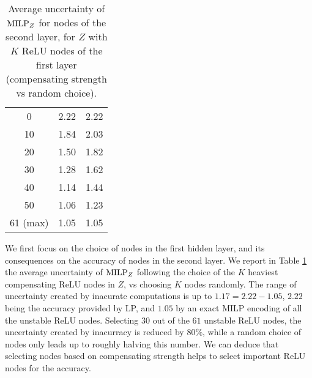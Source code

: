 \begin{table}[b!]
	\centering
	\begin{tabular}{|c||c|c|}
		\hline
		\text{Number $K$ of nodes in $Z$}  &  \text{Compensate strength} & \text{Random Choice}  \\ \hline
		\hline
		0  &  2.22 & 2.22  \\ \hline
		10  &  1.84 & 2.03  \\ \hline
		20  &  1.50 & 1.82  \\ \hline
		30  &  1.28 & 1.62  \\ \hline
		40  &  1.14 & 1.44  \\ \hline
		50  &  1.06 & 1.23  \\ \hline
		61 (max) & 1.05 &  1.05 \\ \hline
	\end{tabular}
	\caption{Average uncertainty of ${\textrm{MILP}}_Z$ for nodes of the second layer, for $Z$ with $K$ ReLU nodes of the first layer (compensating strength vs random choice).}
	\label{tab:example0}
\end{table}




We first focus on the choice of nodes in the first hidden layer, and its consequences on the accuracy of nodes in the second layer. 
We report in Table \ref{tab:example0} the average uncertainty of ${\textrm{MILP}}_Z$ following the choice of the $K$ heaviest compensating ReLU nodes in $Z$, vs choosing $K$ nodes randomly. The range of uncertainty created by inacurate computations is up to $1.17=2.22-1.05$, $2.22$ being the accuracy provided by LP, and $1.05$ by an exact MILP encoding of all the unstable ReLU nodes. Selecting $30$ out of the $61$ unstable ReLU nodes, the uncertainty created by inacurracy is reduced by $80\%$, while a random choice of nodes only leads up to roughly halving this number. We can deduce that selecting nodes based on compensating strength helps to select important ReLU nodes for the accuracy.





